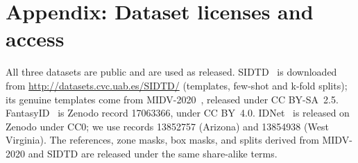 \documentclass[12pt,a4paper]{article}
\newif\ifshowguidance
\newcommand{\todo}[1]{\ifshowguidance\leavevmode{\color{gray}\itshape [#1]}\fi}
\begin{document}
\FloatBarrier



\appendix
\section{Appendix: Dataset licenses and access}
All three datasets are public and are used as released. SIDTD~\cite{boned2024sidtd} is downloaded from \url{http://datasets.cvc.uab.es/SIDTD/} (templates, few-shot and k-fold splits); its genuine templates come from MIDV-2020~\cite{bulatov2022midv2020}, released under CC BY-SA~2.5. FantasyID~\cite{korshunov2025fantasyid} is Zenodo record 17063366, under CC BY~4.0. IDNet~\cite{guan2024idnet} is released on Zenodo under CC0; we use records 13852757 (Arizona) and 13854938 (West Virginia). The references, zone masks, box masks, and splits derived from MIDV-2020 and SIDTD are released under the same share-alike terms. \todo{Confirm the SIDTD data license version on the download server before submission.}
\end{document}
